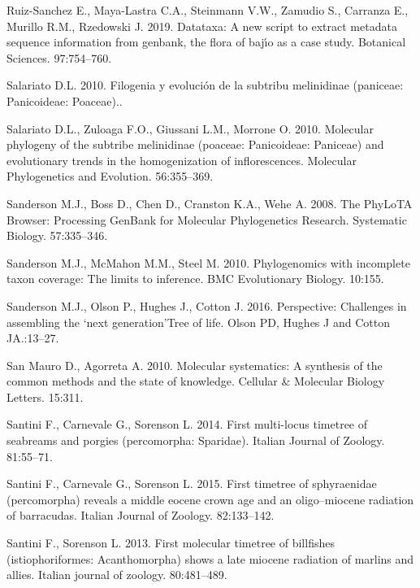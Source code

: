 \documentclass[]{article}
\begin{document}
\leavevmode\hypertarget{ref-ruiz2019datataxa}{}%
Ruiz-Sanchez E., Maya-Lastra C.A., Steinmann V.W., Zamudio S., Carranza E., Murillo R.M., Rzedowski J. 2019. Datataxa: A new script to extract metadata sequence information from genbank, the flora of bajı́o as a case study. Botanical Sciences. 97:754--760.

\leavevmode\hypertarget{ref-salariato2010filogenia}{}%
Salariato D.L. 2010. Filogenia y evolución de la subtribu melinidinae (paniceae: Panicoideae: Poaceae)..

\leavevmode\hypertarget{ref-salariato2010molecular}{}%
Salariato D.L., Zuloaga F.O., Giussani L.M., Morrone O. 2010. Molecular phylogeny of the subtribe melinidinae (poaceae: Panicoideae: Paniceae) and evolutionary trends in the homogenization of inflorescences. Molecular Phylogenetics and Evolution. 56:355--369.

\leavevmode\hypertarget{ref-sanderson2008phylota}{}%
Sanderson M.J., Boss D., Chen D., Cranston K.A., Wehe A. 2008. The PhyLoTA Browser: Processing GenBank for Molecular Phylogenetics Research. Systematic Biology. 57:335--346.

\leavevmode\hypertarget{ref-sanderson2010phylogenomics}{}%
Sanderson M.J., McMahon M.M., Steel M. 2010. Phylogenomics with incomplete taxon coverage: The limits to inference. BMC Evolutionary Biology. 10:155.

\leavevmode\hypertarget{ref-sanderson2016perspective}{}%
Sanderson M.J., Olson P., Hughes J., Cotton J. 2016. Perspective: Challenges in assembling the `next generation'Tree of life. Olson PD, Hughes J and Cotton JA.:13--27.

\leavevmode\hypertarget{ref-san2010molecular}{}%
San Mauro D., Agorreta A. 2010. Molecular systematics: A synthesis of the common methods and the state of knowledge. Cellular \& Molecular Biology Letters. 15:311.

\leavevmode\hypertarget{ref-santini2014first}{}%
Santini F., Carnevale G., Sorenson L. 2014. First multi-locus timetree of seabreams and porgies (percomorpha: Sparidae). Italian Journal of Zoology. 81:55--71.

\leavevmode\hypertarget{ref-santini2015first}{}%
Santini F., Carnevale G., Sorenson L. 2015. First timetree of sphyraenidae (percomorpha) reveals a middle eocene crown age and an oligo--miocene radiation of barracudas. Italian Journal of Zoology. 82:133--142.

\leavevmode\hypertarget{ref-santini2013first}{}%
Santini F., Sorenson L. 2013. First molecular timetree of billfishes (istiophoriformes: Acanthomorpha) shows a late miocene radiation of marlins and allies. Italian journal of zoology. 80:481--489.
\end{document}
